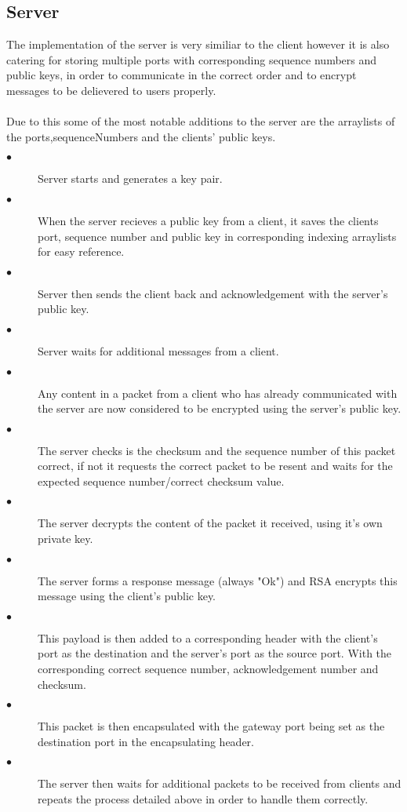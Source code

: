 \documentclass[10pt]{article}
\begin{document}
\subsection{Server}
The implementation of the server is very similiar to the client however it is also catering for storing multiple ports with corresponding sequence numbers and public keys, in order to communicate in the correct order and to encrypt messages to be delievered to users properly.\\\\Due to this some of the most notable additions to the server are the arraylists of the ports,sequenceNumbers and the clients' public keys.
\begin{description}
	\item[$\bullet$ ] Server starts and generates a key pair.
	\item[$\bullet$ ] When the server recieves a public key from a client, it saves the clients port, sequence number and public key in corresponding indexing arraylists for easy reference.
	\item[$\bullet$ ] Server then sends the client back and acknowledgement with the server's public key.
	\item[$\bullet$ ] Server waits for additional messages from a client.
	\item[$\bullet$ ] Any content in a packet from a client who has already communicated with the server are now considered to be encrypted using the server's public key. 
	\item[$\bullet$ ] The server checks is the checksum and the sequence number of this packet correct, if not it requests the correct packet to be resent and waits for the expected sequence number/correct checksum value.
	\item[$\bullet$ ] The server decrypts the content of the packet it received, using it's own private key.
	\item[$\bullet$ ] The server forms a response message (always "Ok") and RSA encrypts this message using the client's public key.
	\item[$\bullet$ ] This payload is then added to a corresponding header with the client's port as the destination and the server's port as the source port. With the corresponding correct sequence number, acknowledgement number and checksum.
	\item[$\bullet$ ] This packet is then encapsulated with the gateway port being set as the destination port in the encapsulating header.
	\item[$\bullet$ ] The server then waits for additional packets to be received from clients and repeats the process detailed above in order to handle them correctly.
\end{description}\newpage
\end{document}
